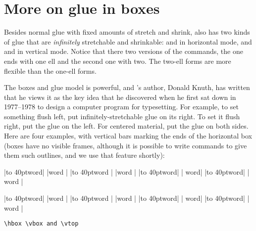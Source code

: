 \section{More on glue in boxes}

Besides normal glue with fixed amounts of stretch and shrink, \tex also has
two kinds of glue that are \emph{infinitely} stretchable and shrinkable:  and
 in horizontal mode, and  and  in vertical mode. Notice that there two versions
of the commands, the one ends with one ell and the second one with two. The
two-ell forms are more flexible than the one-ell forms.

The boxes and glue model is powerful, and \tex's author, Donald Knuth,
has written that he views it as the key idea that he discovered when he
first sat down in 1977--1978 to design a computer program for typesetting.
For example, to set something flush left, put infinitely-stretchable glue on
its right. To set it flush right, put the glue on the left. For centered material,
put the glue on both sides. Here are four examples, with vertical
bars marking the ends of the horizontal box (boxes have no visible frames,
although it is possible to write \tex commands to give them such outlines,
and we use that feature shortly):

\begin{teX}
|\hbox to 40pt{word}| |word |
|\hbox to 40pt{word \hfil}| |word |
|\hbox to 40pt{\hfil word}| | word|
|\hbox to 40pt{\hfil word\hfil}| | word |
\end{teX}

{\obeylines
|\hbox to 40pt{word}| |word |
|\hbox to 40pt{word \hfil}| |word |
|\hbox to 40pt{\hfil word}| | word|
|\hbox to 40pt{\hfil word\hfil}| | word |
}

\clearpage


\medskip

{\tt \protect\textbackslash hbox \protect\textbackslash vbox and \protect\textbackslash vtop}

